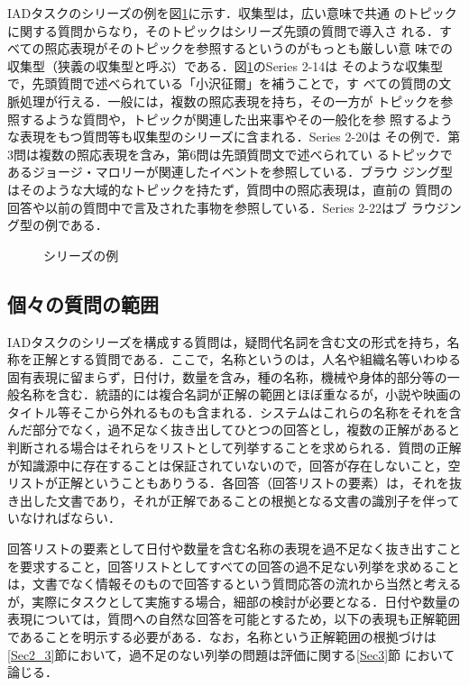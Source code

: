 \documentclass[japanese]{jnlp_1.4}
\begin{document}
IADタスクのシリーズの例を図\ref{samples}に示す．収集型は，広い意味で共通
のトピックに関する質問からなり，そのトピックはシリーズ先頭の質問で導入さ
れる．すべての照応表現がそのトピックを参照するというのがもっとも厳しい意
味での収集型（狭義の収集型と呼ぶ）である．図\ref{samples}のSeries 2-14は
そのような収集型で，先頭質問で述べられている「小沢征爾」を補うことで，す
べての質問の文脈処理が行える．一般には，複数の照応表現を持ち，その一方が
トピックを参照するような質問や，トピックが関連した出来事やその一般化を参
照するような表現をもつ質問等も収集型のシリーズに含まれる．Series 2-20は
その例で．第3問は複数の照応表現を含み，第6問は先頭質問文で述べられてい
るトピックであるジョージ・マロリーが関連したイベントを参照している．ブラウ
ジング型はそのような大域的なトピックを持たず，質問中の照応表現は，直前の
質問の回答や以前の質問中で言及された事物を参照している．Series 2-22はブ
ラウジング型の例である．

\begin{figure}[b]

\caption{シリーズの例}
\label{samples}
\end{figure}



\subsection{個々の質問の範囲}

IADタスクのシリーズを構成する質問は，疑問代名詞を含む文の形式を持ち，名
称を正解とする質問である．ここで，名称というのは，人名や組織名等いわゆる
固有表現に留まらず，日付け，数量を含み，種の名称，機械や身体的部分等の一
般名称を含む．統語的には複合名詞が正解の範囲とほぼ重なるが，小説や映画の
タイトル等そこから外れるものも含まれる．システムはこれらの名称をそれを含
んだ部分でなく，過不足なく抜き出してひとつの回答とし，複数の正解があると
判断される場合はそれらをリストとして列挙することを求められる．質問の正解
が知識源中に存在することは保証されていないので，回答が存在しないこと，空
リストが正解ということもありうる．各回答（回答リストの要素）は，それを抜
き出した文書であり，それが正解であることの根拠となる文書の識別子を伴って
いなければならい．

回答リストの要素として日付や数量を含む名称の表現を過不足なく抜き出すこと
を要求すること，回答リストとしてすべての回答の過不足ない列挙を求めること
は，文書でなく情報そのもので回答するという質問応答の流れから当然と考える
が，実際にタスクとして実施する場合，細部の検討が必要となる．日付や数量の
表現については，質問への自然な回答を可能とするため，以下の表現も正解範囲
であることを明示する必要がある．なお，名称という正解範囲の根拠づけは
\ref{Sec2_3}節において，過不足のない列挙の問題は評価に関する\ref{Sec3}節
において論じる．
\end{document}
